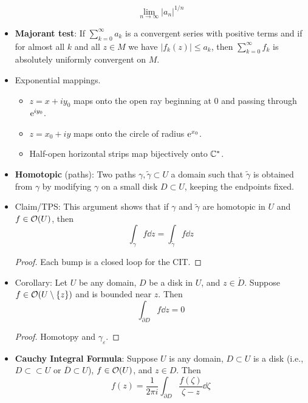 \documentclass[../notes.tex]{subfiles}
\begin{document}
\begin{itemize}
\begin{equation*}
        \lim_{n\to\infty}\left| a_n \right|^{1/n}
    \end{equation*}
    \item \textbf{Majorant test}: If $\sum_{k=0}^\infty a_k$ is a convergent series with positive terms and if for almost all $k$ and all $z\in M$ we have $|f_k(z)|\leq a_k$, then $\sum_{k=0}^\infty f_k$ is absolutely uniformly convergent on $M$.
    \item Exponential mappings.
    \begin{itemize}
        \item $z=x+iy_0$ maps onto the open ray beginning at 0 and passing through $\e[iy_0]$.
        \item $z=x_0+iy$ maps onto the circle of radius $\e[x_0]$.
        \item Half-open horizontal strips map bijectively onto $\C^*$.
    \end{itemize}
    \item \textbf{Homotopic} (paths): Two paths $\gamma,\tilde{\gamma}\subset U$ a domain such that $\tilde{\gamma}$ is obtained from $\gamma$ by modifying $\gamma$ on a small disk $D\subset U$, keeping the endpoints fixed.
    \item Claim/TPS: This argument shows that if $\gamma$ and $\tilde{\gamma}$ are homotopic in $U$ and $f\in\mO(U)$, then
    \begin{equation*}
        \int_\gamma f\dd{z} = \int_{\tilde{\gamma}}f\dd{z}
    \end{equation*}
    \begin{proof}
        Each bump is a closed loop for the CIT.
    \end{proof}
    \item Corollary: Let $U$ be any domain, $D$ be a disk in $U$, and $z\in\mathring{D}$. Suppose $f\in\mO(U\setminus\{z\})$ and is bounded near $z$. Then
    \begin{equation*}
        \int_{\partial D}f\dd{z} = 0
    \end{equation*}
    \begin{proof}
        Homotopy and $\gamma_\varepsilon$.
    \end{proof}
    \item \textbf{Cauchy Integral Formula}: Suppose $U$ is any domain, $D\subset U$ is a disk (i.e., $D\subset\subset U$ or $\overline{D}\subset U$), $f\in\mO(U)$, and $z\in D$. Then
    \begin{equation*}
        f(z) = \frac{1}{2\pi i}\int_{\partial D}\frac{f(\zeta)}{\zeta-z}\dd\zeta
    \end{equation*}

\end{itemize}
\end{document}
